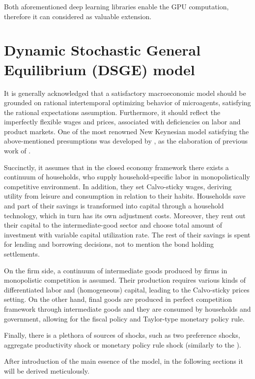 \documentclass{pracamgr}
\numberwithin{equation}{section}
\begin{document}
Both aforementioned deep learning libraries enable the GPU computation, therefore it can considered as valuable extension.

\chapter{Dynamic Stochastic General Equilibrium (DSGE) model} \label{Dynamic Stochastic General Equilibrium (DSGE) model}

It is generally acknowledged that a satisfactory macroeconomic model should be grounded on rational intertemporal optimizing behavior of microagents, satisfying the rational expectations assumption. Furthermore, it should reflect the imperfectly flexible wages and prices, associated with deficiencies on labor and product markets. One of the most renowned New Keynesian model satisfying the above-mentioned presumptions was developed by \citet{smets2003estimated}, as the elaboration of previous work of \citet{christiano2001nominal}.

Succinctly, it assumes that in the closed economy framework there exists a continuum of households, who supply household-specific labor in monopolistically competitive environment. In addition, they set Calvo-sticky wages, deriving utility from leisure and consumption in relation to their habits. Households save and part of their savings is transformed into capital through a household technology, which in turn has its own adjustment costs. Moreover, they rent out their capital to the intermediate-good sector and choose total amount of  investment with variable capital utilization rate. The rest of their savings is spent for lending and borrowing decisions, not to mention the bond holding settlements.

On the firm side, a continuum of intermediate goods produced by firms in monopolistic competition is assumed. Their production requires various kinds of differentiated labor and (homogeneous) capital, leading to the Calvo-sticky prices setting. On the other hand, final goods are produced in perfect competition framework through intermediate goods and they are consumed by households and government, allowing for the fiscal policy and Taylor-type monetary policy rule.

Finally, there is a plethora of sources of shocks, such as two preference shocks, aggregate productivity shock or monetary policy rule shock (similarly to the \citet{christiano2005nominal}).

After introduction of the main essence of the \citet{smets2003estimated}  model, in the following sections it will be derived meticulously.
\end{document}
